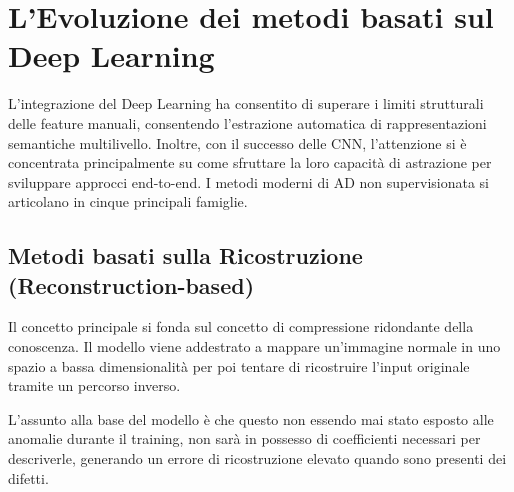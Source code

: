 \section{L'Evoluzione dei metodi basati sul Deep Learning}

L'integrazione del Deep Learning ha consentito di superare i limiti strutturali delle feature manuali, consentendo l'estrazione automatica di rappresentazioni semantiche multilivello. Inoltre, con il successo delle CNN, l'attenzione si è concentrata principalmente su come sfruttare la loro capacità di astrazione per sviluppare approcci end-to-end.
I metodi moderni di AD non supervisionata si articolano in cinque principali famiglie.\cite{Cui_et_al._2023}

\subsection{Metodi basati sulla Ricostruzione (Reconstruction-based)}
Il concetto principale si fonda sul concetto di compressione ridondante della conoscenza. Il modello viene addestrato a mappare un'immagine normale in uno spazio a bassa dimensionalità per poi tentare di ricostruire l'input originale tramite un percorso inverso.\cite{Yang_et_al._2021}

L'assunto alla base del modello è che questo non essendo mai stato esposto alle anomalie durante il training, non sarà in possesso di coefficienti necessari per descriverle, generando un errore di ricostruzione elevato quando sono presenti dei difetti.

